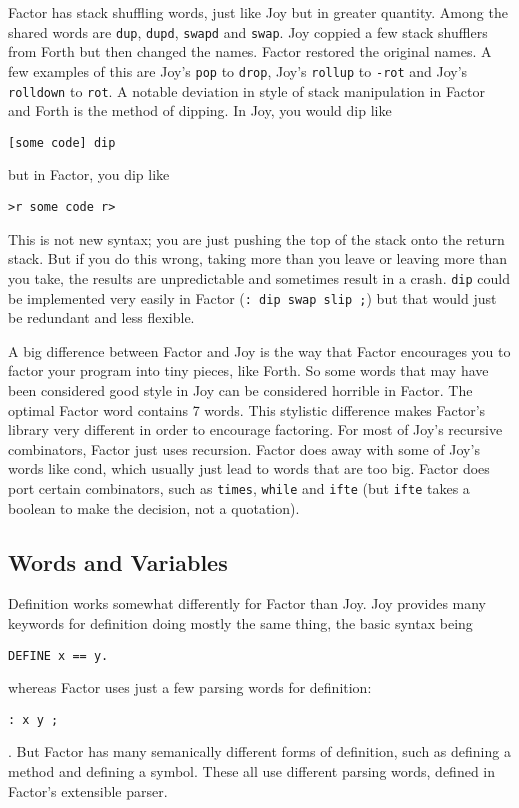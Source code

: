 \documentclass{article}
\begin{document}
Factor has stack shuffling words, just like Joy but in greater quantity. Among the shared words are \texttt{dup}, \texttt{dupd}, \texttt{swapd} and \texttt{swap}. Joy coppied a few stack shufflers from Forth but then changed the names. Factor restored the original names. A few examples of this are Joy's \texttt{pop} to \texttt{drop}, Joy's \texttt{rollup} to \texttt{-rot} and Joy's \texttt{rolldown} to \texttt{rot}. A notable deviation in style of stack manipulation in Factor and Forth is the method of dipping. In Joy, you would dip like
\begin{verbatim}
[some code] dip
\end{verbatim}
but in Factor, you dip like
\begin{verbatim}
>r some code r>
\end{verbatim}
This is not new syntax; you are just pushing the top of the stack onto the return stack. But if you do this wrong, taking more than you leave or leaving more than you take, the results are unpredictable and sometimes result in a crash. \texttt{dip} could be implemented very easily in Factor (\verb|: dip swap slip ;|) but that would just be redundant and less flexible.

A big difference between Factor and Joy is the way that Factor encourages you to factor your program into tiny pieces, like Forth. So some words that may have been considered good style in Joy can be considered horrible in Factor. The optimal Factor word contains 7 words. This stylistic difference makes Factor's library very different in order to encourage factoring. For most of Joy's recursive combinators, Factor just uses recursion. Factor does away with some of Joy's words like cond, which usually just lead to words that are too big. Factor does port certain combinators, such as \texttt{times}, \texttt{while} and \texttt{ifte} (but \texttt{ifte} takes a boolean to make the decision, not a quotation).

\subsection{Words and Variables}

Definition works somewhat differently for Factor than Joy. Joy provides many keywords for definition doing mostly the same thing, the basic syntax being
\begin{verbatim}
DEFINE x == y.
\end{verbatim}
whereas Factor uses just a few parsing words for definition:
\begin{verbatim}
: x y ;
\end{verbatim}
. But Factor has many semanically different forms of definition, such as defining a method and defining a symbol. These all use different parsing words, defined in Factor's extensible parser.
\end{document}
